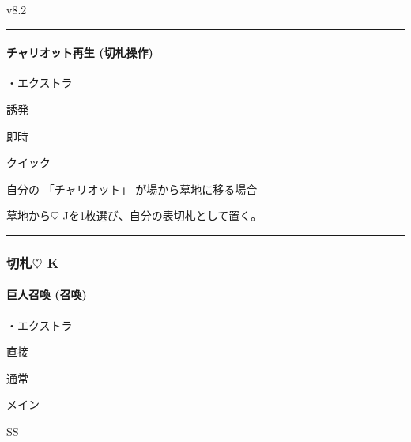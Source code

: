 \documentclass[letterpaper,10pt,dvipdfmx]{sphinxmanual}
\begin{document}
\sphinxAtStartPar
{}  v8.2


\bigskip\hrule\bigskip



\paragraph{チャリオット再生 (切札操作)}
\label{\detokenize{auto/frameActionlist:act-chariotrevive}}\label{\detokenize{auto/frameActionlist:id48}}
\sphinxAtStartPar
{}

\sphinxAtStartPar
・エクストラ

\sphinxAtStartPar
{} 誘発

\sphinxAtStartPar
{} 即時

\sphinxAtStartPar
{} クイック

\sphinxAtStartPar
{}

\sphinxAtStartPar
自分の 「チャリオット」 が場から墓地に移る場合

\sphinxAtStartPar
{}

\sphinxAtStartPar
墓地から{\normalsize $\heartsuit$} Jを1枚選び、自分の表切札として置く。


\bigskip\hrule\bigskip



\subsubsection{切札{\normalsize $\heartsuit$} K}
\label{\detokenize{auto/frameActionlist:id49}}

\paragraph{巨人召喚 (召喚)}
\label{\detokenize{auto/frameActionlist:act-summongiant}}\label{\detokenize{auto/frameActionlist:id50}}
\sphinxAtStartPar
{}

\sphinxAtStartPar
・エクストラ

\sphinxAtStartPar
{} 直接

\sphinxAtStartPar
{} 通常

\sphinxAtStartPar
{} メイン

\sphinxAtStartPar
{} SS
\end{document}
